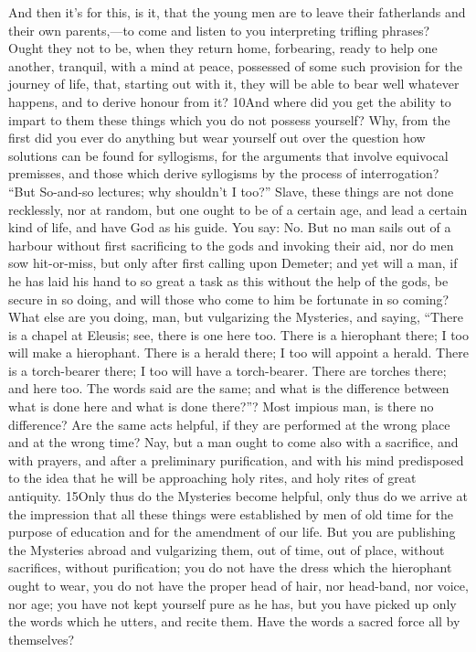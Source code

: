 And then it's for this, is it, that the young men are to leave their fatherlands and their own parents,—to come and listen to you interpreting trifling phrases? Ought they not to be, when they return home, forbearing, ready to help one another, tranquil, with a mind at peace, possessed of some such provision for the journey of life, that, starting out with it, they will be able to bear well whatever happens, and to derive honour from it? 10And where did you get the ability to impart to them these things which you do not possess yourself? Why, from the first did you ever do anything but wear yourself out over the question how solutions can be found for syllogisms, for the arguments that involve equivocal premisses, and those which derive syllogisms by the process of interrogation? ``But So-and-so lectures; why shouldn't I too?'' Slave, these things are not done recklessly, nor at random, but one ought to be of a certain age, and lead a certain kind of life, and have God as his guide. You say: No. But no man sails out of a harbour without first sacrificing to the gods and invoking their aid, nor do men sow hit-or-miss, but only after first calling upon Demeter; and yet will a man, if he has laid his hand to so great a task as this without the help of the gods, be secure in so doing, and will those who come to him be fortunate in so coming? What else are you doing, man, but vulgarizing the Mysteries, and saying, ``There is a chapel at Eleusis; see, there is one here too. There is a hierophant there; I too will make a hierophant. There is a herald there; I too will appoint a herald. There is a torch-bearer there; I too will have a torch-bearer. There are torches there; and here too. The words said are the same; and what is the difference between what is done here and what is done there?''? Most impious man, is there no difference? Are the same acts helpful, if they are performed at the wrong place and at the wrong time? Nay, but a man ought to come also with a sacrifice, and with prayers, and after a preliminary purification, and with his mind predisposed to the idea that he will be approaching holy rites, and holy rites of great antiquity. 15Only thus do the Mysteries become helpful, only thus do we arrive at the impression that all these things were established by men of old time for the purpose of education and for the amendment of our life. But you are publishing the Mysteries abroad and vulgarizing them, out of time, out of place, without sacrifices, without purification; you do not have the dress which the hierophant ought to wear, you do not have the proper head of hair, nor head-band, nor voice, nor age; you have not kept yourself pure as he has, but you have picked up only the words which he utters, and recite them. Have the words a sacred force all by themselves?

